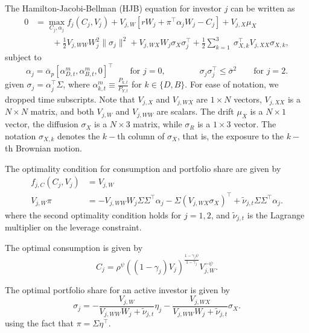 The Hamilton-Jacobi-Bellman (HJB) equation for investor $j$ can be written as
\begin{align}
    0 &= \max_{C_j, \alpha_j} f_j(C_j,V_j) + V_{j,W}\left[ r W_j + \pi^\top \alpha_j W_j  - C_j\right] +V_{j,X} \mu_X\nonumber\\
    &\qquad + \frac{1}{2} V_{j,WW} W_j^2 \|\sigma_j\|^2 + V_{j,WX}W_j \sigma_X \sigma_j^\top    + \frac{1}{2} \sum_{k=1}^3\ \sigma_{X,k}^\top V_{j,XX} \sigma_{X,k},
\end{align}
subject to 
\begin{equation}
    \alpha_j = \overline{\alpha}_p[ \alpha_{D,t}^m, \alpha_{B,t}^m, 0]^\top \qquad \text{for } j = 0, \qquad \qquad 
    \sigma_j \sigma_j^\top \leq \overline{\sigma}^2 \qquad \text{for } j = 2.
\end{equation}
given $\sigma_{j} = \alpha_j^\top \Sigma$, where $\alpha_{k,t}^m \equiv \frac{P_{k,t}}{P_{Y,t}}$ for $k \in \{D,B\}$.
For ease of notation, we dropped time subscripts.
Note that  $V_{j,X}$ and $V_{j,WX}$ are $1\times N$ vectors, $V_{j,XX}$ is a $N\times N$ matrix, and both $V_{j,W}$ and $V_{j,WW}$ are scalars.
The drift $\mu_X$ is a $N\times 1$ vector, the diffusion $\sigma_X$ is a $N\times 3$ matrix, while $\sigma_R$ is a $1\times 3$ vector.
The notation $\sigma_{X,k}$ denotes the $k-$th column of $\sigma_{X}$, that is, the exposure to the $k-$th Brownian motion.



The optimality condition for consumption and portfolio share are given by
\begin{align}
    f_{j,C}(C_j,V_j) &= V_{j,W}\\
    V_{j,W} \pi &= - V_{j,WW} W_j \Sigma \Sigma^\top \alpha_j -  \Sigma (V_{j,WX} \sigma_X)^\top + \tilde{\nu}_{j,t} \Sigma \Sigma^\top \alpha_{j}.
\end{align}
where the second optimality condition holds for $j = 1,2$, and $\tilde{\nu}_{j,t}$ is the Lagrange multiplier on the leverage constraint. 

The optimal consumption is given by
\begin{equation}
 C_j = \rho^\psi ((1-\gamma_j) V_j)^{\frac{1-\gamma_j\psi }{1-\gamma_j}}V_{j,W}^{-\psi}.
\end{equation}

The optimal portfolio share for an active investor is given by
\begin{equation}
\sigma_j =  -\frac{V_{j,W}}{V_{j,WW} W_j + \tilde{\nu}_{j,t}}  \eta_j   - \frac{V_{j,WX}}{V_{j,WW} W_j + \tilde{\nu}_{j,t}} \sigma_X.
\end{equation}
using the fact that $\pi = \Sigma \eta^\top$.

